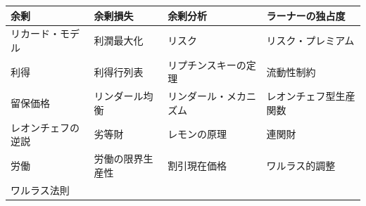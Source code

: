 \documentclass[xelatex,a4paper,base=11pt,ja=standard,jafont=noto]{bxjsreport}
\begin{document}
\begin{table}[H]
\begin{tabular}{|>{\raggedright\arraybackslash}p{3.5cm}|>{\raggedright\arraybackslash}p{3.5cm}|>{\raggedright\arraybackslash}p{3.5cm}|>{\raggedright\arraybackslash}p{3.5cm}|}
\hline
余剰 & 余剰損失 & 余剰分析 & ラーナーの独占度 \\
\hline
リカード・モデル & 利潤最大化 & リスク & リスク・プレミアム \\
\hline
利得 & 利得行列表 & リプチンスキーの定理 & 流動性制約 \\
\hline
留保価格 & リンダール均衡 & リンダール・メカニズム & レオンチェフ型生産関数 \\
\hline
レオンチェフの逆説 & 劣等財 & レモンの原理 & 連関財 \\
\hline
労働 & 労働の限界生産性 & 割引現在価格 & ワルラス的調整 \\
\hline
ワルラス法則 & & & \\
\hline
\end{tabular}
\end{table}

\newpage
\end{document}
